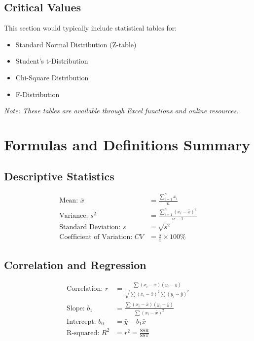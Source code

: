 \documentclass[12pt,a4paper]{book}
\begin{document}
{{\section{Critical Values}

This section would typically include statistical tables for:
\begin{itemize}
    \item Standard Normal Distribution (Z-table)
    \item Student's t-Distribution
    \item Chi-Square Distribution
    \item F-Distribution
\end{itemize}

\textit{Note: These tables are available through Excel functions and online resources.}

\chapter{Formulas and Definitions Summary}

\section{Descriptive Statistics}

\begin{align}
\text{Mean: } \bar{x} &= \frac{\sum_{i=1}^{n} x_i}{n}\\
\text{Variance: } s^2 &= \frac{\sum_{i=1}^{n} (x_i - \bar{x})^2}{n-1}\\
\text{Standard Deviation: } s &= \sqrt{s^2}\\
\text{Coefficient of Variation: } CV &= \frac{s}{\bar{x}} \times 100\%
\end{align}

\section{Correlation and Regression}

\begin{align}
\text{Correlation: } r &= \frac{\sum(x_i - \bar{x})(y_i - \bar{y})}{\sqrt{\sum(x_i - \bar{x})^2 \sum(y_i - \bar{y})^2}}\\
\text{Slope: } b_1 &= \frac{\sum(x_i - \bar{x})(y_i - \bar{y})}{\sum(x_i - \bar{x})^2}\\
\text{Intercept: } b_0 &= \bar{y} - b_1\bar{x}\\
\text{R-squared: } R^2 &= r^2 = \frac{\text{SSR}}{\text{SST}}
\end{align}

}}
\end{document}

